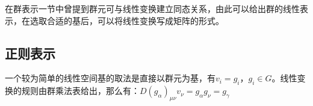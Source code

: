 \begin{issues}
\issueDraft
\end{issues}
在群表示一节中曾提到群元可与线性变换建立同态关系，由此可以给出群的线性表示，在选取合适的基后，可以将线性变换写成矩阵的形式。

\subsection{正则表示}

一个较为简单的线性空间基的取法是直接以群元为基，有$v_i=g_i$，$g_i \in G$。线性变换的规则由群乘法表给出，那么有：$D(g_\alpha)_{\mu\nu}v_\nu=g_\alpha g_\nu=g_\gamma$

